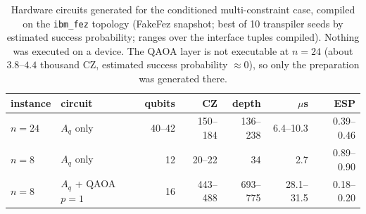\begin{table}[t]
\centering\small\setlength{\tabcolsep}{4pt}
\caption{ Hardware circuits generated for the conditioned multi-constraint case, compiled on the \texttt{ibm\_fez} topology (FakeFez snapshot; best of 10 transpiler seeds by estimated success probability; ranges over the interface tuples compiled). Nothing was executed on a device. The QAOA layer is not executable at $n=24$ (about $3.8$--$4.4$ thousand CZ, estimated success probability $\approx0$), so only the preparation was generated there.}\label{tab:large_hw}
\begin{tabular}{llrrrrr}
\toprule
instance & circuit & qubits & CZ & depth & $\mu$s & ESP\\
\midrule
$n=24$ & $A_q$ only & 40--42 & 150--184 & 136--238 & 6.4--10.3 & 0.39--0.46\\
$n=8$ & $A_q$ only & 12 & 20--22 & 34 & 2.7 & 0.89--0.90\\
$n=8$ & $A_q$ + QAOA $p{=}1$ & 16 & 443--488 & 693--775 & 28.1--31.5 & 0.18--0.20\\
\bottomrule
\end{tabular}
\end{table}
